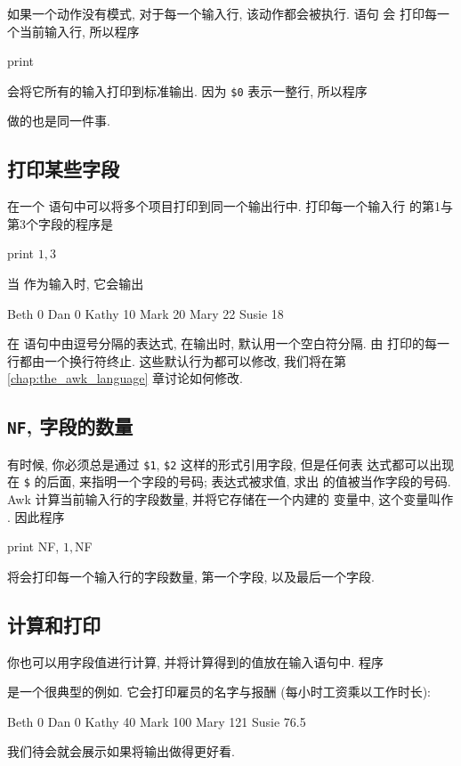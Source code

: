 如果一个动作没有模式, 对于每一个输入行, 该动作都会被执行. 语句 \print 会
打印每一个当前输入行, 所以程序
\begin{awkcode}
    { print }
\end{awkcode}
会将它所有的输入打印到标准输出. 因为 \verb'$0' 表示一整行, 所以程序
做的也是同一件事.

\subsection{打印某些字段}
\label{subsec:printing_certain_fields}

在一个 \print 语句中可以将多个项目打印到同一个输出行中. 打印每一个输入行
的第1与第3个字段的程序是
\begin{awkcode}
    { print $1, $3 }
\end{awkcode}
当  作为输入时, 它会输出
\begin{file}
    Beth 0
    Dan 0
    Kathy 10
    Mark 20
    Mary 22
    Susie 18
\end{file}
在 \print 语句中由逗号分隔的表达式, 在输出时, 默认用一个空白符分隔. 由
\print 打印的每一行都由一个换行符终止. 这些默认行为都可以修改, 我们将在第
\ref{chap:the_awk_language} 章讨论如何修改.

\subsection{\texttt{NF}, 字段的数量}
\label{subsec:nf_the_number_fields}

有时候, 你必须总是通过 \verb'$1', \verb'$2' 这样的形式引用字段, 但是任何表
达式都可以出现在 \verb'$' 的后面, 来指明一个字段的号码; 表达式被求值, 求出
的值被当作字段的号码. Awk 计算当前输入行的字段数量, 并将它存储在一个内建的
变量中, 这个变量叫作 \nf. 因此程序
\begin{awkcode}
    { print NF, $1, $NF }
\end{awkcode}
将会打印每一个输入行的字段数量, 第一个字段, 以及最后一个字段.

\subsection{计算和打印}
\label{subsec:computing_and_printing}

你也可以用字段值进行计算, 并将计算得到的值放在输入语句中. 程序
是一个很典型的例如. 它会打印雇员的名字与报酬 (每小时工资乘以工作时长):
\begin{file}
    Beth 0
    Dan 0
    Kathy 40
    Mark 100
    Mary 121
    Susie 76.5
\end{file}
我们待会就会展示如果将输出做得更好看.

